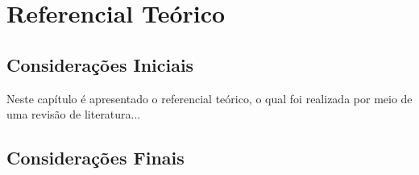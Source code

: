 \chapter{Referencial Teórico}
\label{ch:referencial}

\section{Considerações Iniciais}
Neste capítulo é apresentado o referencial teórico, o qual foi realizada por meio de uma
revisão de literatura...





\section{Considerações Finais}


